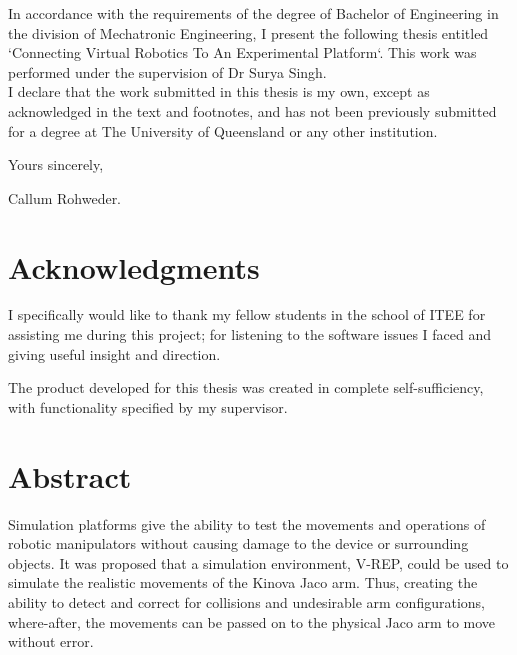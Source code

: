 \documentclass[12pt,openany,a4paper]{book}
\begin{document}
In accordance with the requirements of the degree of Bachelor of
Engineering in the division of 
Mechatronic Engineering,
I present the
following thesis entitled `Connecting Virtual Robotics To An Experimental Platform`.  This work was performed under the supervision of Dr Surya Singh.\\

I declare that the work submitted in this thesis is my own, except as
acknowledged in the text and footnotes, and has not been previously
submitted for a degree at The University of Queensland or any other
institution.

\begin{flushright}
	Yours sincerely,\\
	\medskip

	\medskip
	Callum Rohweder.
\end{flushright}

\cleardoublepage

\chapter{Acknowledgments}

I specifically would like to thank my fellow students in the school of ITEE for assisting me during this project; for listening to the software issues I faced and giving useful insight and direction.

The product developed for this thesis was created in complete self-sufficiency, with functionality specified by my supervisor.


\cleardoublepage

\chapter{Abstract}

Simulation platforms give the ability to test the movements and operations of robotic manipulators without causing damage to the device or surrounding objects. It was proposed that a simulation environment, V-REP, could be used to simulate the realistic movements of the Kinova Jaco arm. Thus, creating the ability to detect and correct for collisions and undesirable arm configurations, where-after, the movements can be passed on to the physical Jaco arm to move without error.\\
\end{document}

